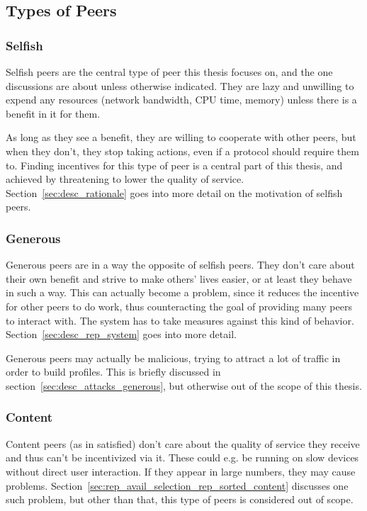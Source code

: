 \subsection{Types of Peers}
\subsubsection{Selfish}
Selfish peers are the central type of peer this thesis focuses on, and the one
discussions are about unless otherwise indicated. They are lazy
and unwilling to expend any resources (network bandwidth, CPU time, memory)
unless there is a benefit in it for them.

As long as they see a benefit, they are willing to cooperate with other peers,
but when they don't, they stop taking actions, even if a protocol should require
them to. Finding incentives for this type of peer is a central part of this
thesis, and achieved by threatening to lower the quality of service.
Section~\ref{sec:desc_rationale} goes into more detail on the motivation of
selfish peers.

\subsubsection{Generous}
\label{sec:desc_generous_peers}
Generous peers are in a way the opposite of selfish peers. They don't care about
their own benefit and strive to make others' lives easier, or at least they
behave in such a way. This can actually become a problem, since it reduces the
incentive for other peers to do work, thus counteracting the goal of providing
many peers to interact with. The system has to take measures against this kind
of behavior. Section~\ref{sec:desc_rep_system} goes into more detail.

Generous peers may actually be malicious, trying to attract a lot of traffic in
order to build profiles. This is briefly discussed in
section~\ref{sec:desc_attacks_generous}, but otherwise out of the scope of this
thesis.

\subsubsection{Content}
\label{sec:desc_content_peers}
Content peers (as in satisfied) don't care about the quality of service they
receive and thus can't be incentivized via it. These could e.g. be running on
slow devices without direct user interaction. If they appear in large numbers,
they may cause problems.
Section~\ref{sec:rep_avail_selection_rep_sorted_content} discusses one such
problem, but other than that, this type of peers is considered out of scope.

